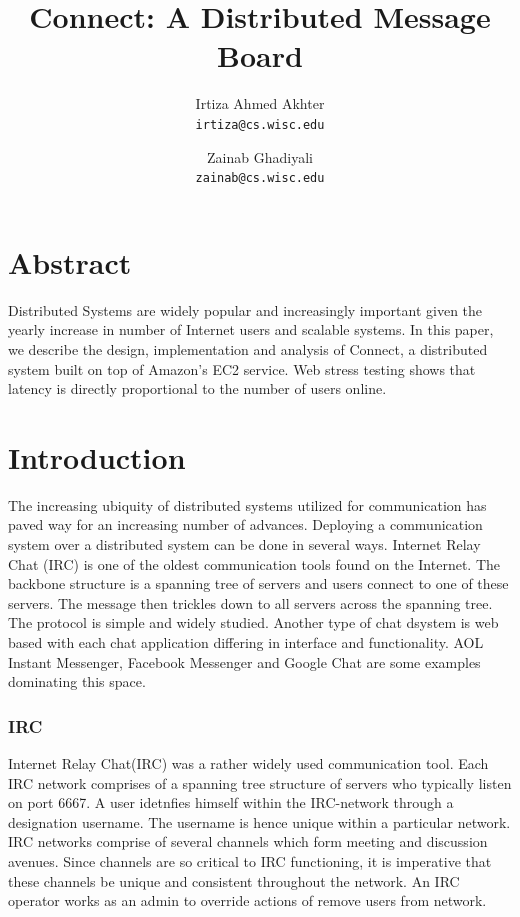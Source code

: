 \documentclass[12pt, twocolumn]{article}
\title{Connect: A Distributed Message Board}
\author{Irtiza Ahmed Akhter\\
\texttt{irtiza@cs.wisc.edu} \and Zainab Ghadiyali\\ \texttt{zainab@cs.wisc.edu}}
\begin{document}
\maketitle



\section{Abstract}
Distributed Systems are widely popular and increasingly important given the yearly increase in number of Internet users and scalable systems. In this paper, we describe the design, implementation and analysis of Connect, a distributed system built on top of Amazon's EC2 service. Web stress testing shows that latency is directly proportional to the number of users online. 
 
\section{Introduction}
\label{Introduction}

The increasing ubiquity of distributed systems utilized for communication has paved way for an increasing number of advances. Deploying a communication system over a distributed system can be done in several ways. Internet Relay Chat (IRC) is one of the oldest communication tools found on the Internet. The backbone structure is a spanning tree of servers and users connect to one of these servers. The message then trickles down to all servers across the spanning tree. The protocol is simple and widely studied. Another type of chat dsystem is web based with each chat application differing in interface and functionality. AOL Instant Messenger, Facebook Messenger and Google Chat are some examples dominating this space.
 
\subsubsection{IRC}
Internet Relay Chat(IRC\cite{IRC}) was a rather widely used communication tool. Each IRC network comprises of a spanning tree structure of servers who typically listen on port 6667. A user idetnfies himself within the IRC-network through a designation username. The username is hence unique within a particular network. 
IRC networks comprise of several channels which form meeting and discussion avenues. Since channels are so critical to IRC functioning, it is imperative that these channels be unique and consistent throughout the network. An IRC operator works as an admin to override actions of remove users from network. 
\end{document}
